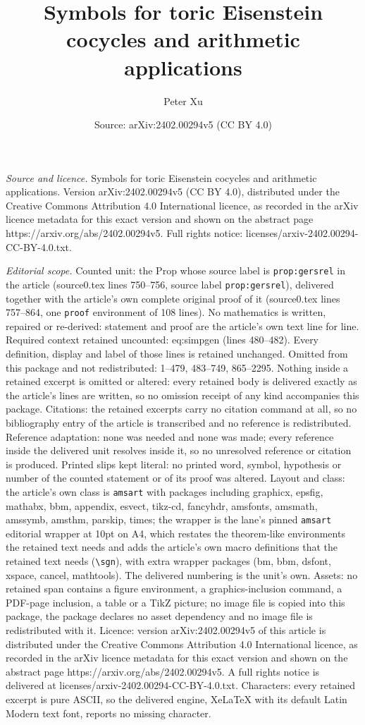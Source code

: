 \documentclass[10pt,a4paper]{amsart}
\title[Symbols for toric Eisenstein cocycles and arithmetic applica]{Symbols for toric Eisenstein cocycles and arithmetic applications}
\author{Peter Xu}
\date{Source: arXiv:2402.00294v5 (CC BY 4.0)}
\begin{document}
\maketitle

\noindent\emph{Source and licence.} Symbols for toric Eisenstein cocycles and arithmetic applications. Version arXiv:2402.00294v5 (CC BY 4.0), distributed under the Creative Commons Attribution 4.0 International licence, as recorded in the arXiv licence metadata for this exact version and shown on the abstract page https://arxiv.org/abs/2402.00294v5. Full rights notice: licenses/arxiv-2402.00294-CC-BY-4.0.txt.\par\smallskip

\noindent\textit{Editorial scope.} Counted unit: the Prop whose source label is \texttt{prop:gersrel} in the article (source0.tex lines 750--756, source label \texttt{prop:gersrel}), delivered together with the article's own complete original proof of it (source0.tex lines 757--864, one \texttt{proof} environment of 108 lines). No mathematics is written, repaired or re-derived: statement and proof are the article's own text line for line. Required context retained uncounted: eq:simpgen (lines 480--482). Every definition, display and label of those lines is retained unchanged. Omitted from this package and not redistributed: 1--479, 483--749, 865--2295. Nothing inside a retained excerpt is omitted or altered: every retained body is delivered exactly as the article's lines are written, so no omission receipt of any kind accompanies this package. Citations: the retained excerpts carry no citation command at all, so no bibliography entry of the article is transcribed and no reference is redistributed. Reference adaptation: none was needed and none was made; every reference inside the delivered unit resolves inside it, so no unresolved reference or citation is produced. Printed slips kept literal: no printed word, symbol, hypothesis or number of the counted statement or of its proof was altered. Layout and class: the article's own class is \texttt{amsart} with packages including graphicx, epsfig, mathabx, bbm, appendix, esvect, tikz-cd, fancyhdr, amsfonts, amsmath, amssymb, amsthm, parskip, times; the wrapper is the lane's pinned \texttt{amsart} editorial wrapper at 10pt on A4, which restates the theorem-like environments the retained text needs and adds the article's own macro definitions that the retained text needs (\texttt{\textbackslash sgn}), with extra wrapper packages (bm, bbm, dsfont, xspace, cancel, mathtools). The delivered numbering is the unit's own. Assets: no retained span contains a figure environment, a graphics-inclusion command, a PDF-page inclusion, a table or a TikZ picture; no image file is copied into this package, the package declares no asset dependency and no image file is redistributed with it. Licence: version arXiv:2402.00294v5 of this article is distributed under the Creative Commons Attribution 4.0 International licence, as recorded in the arXiv licence metadata for this exact version and shown on the abstract page https://arxiv.org/abs/2402.00294v5. A full rights notice is delivered at licenses/arxiv-2402.00294-CC-BY-4.0.txt. Characters: every retained excerpt is pure ASCII, so the delivered engine, XeLaTeX with its default Latin Modern text font, reports no missing character.
\end{document}
